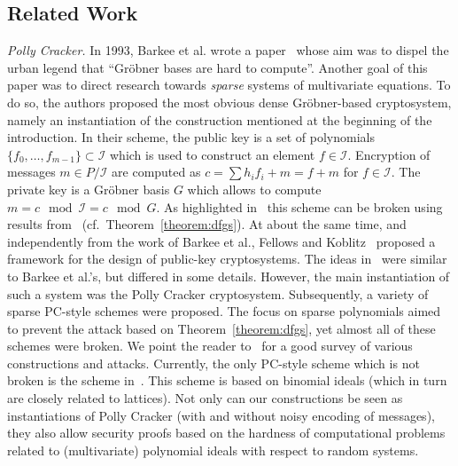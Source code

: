 \documentclass[draft]{llncs}
\newcommand{\sys}{\ensuremath{f_0,\dots,f_{m-1}}\xspace}
\newcommand{\I}{\ensuremath{\mathcal{I}}\xspace}
\begin{document}
\vspace{-4mm} \subsection{Related Work}
\vspace{-2mm}
{\it Polly Cracker.} In 1993, Barkee et al. wrote a paper~\cite{DBLP:journals/jsc/BarkeeCEMR94} whose aim was to dispel the urban legend that ``Gröbner bases are hard to compute''. Another goal of this paper was to direct research towards \emph{sparse} systems of multivariate equations.
To do so, the authors proposed the most obvious dense Gröbner-based cryptosystem, namely an instantiation of the construction mentioned at the beginning of the introduction. In their scheme, the public key is a set of polynomials $\{ \sys \} \subset \I$ which is used to construct an element $f \in \I$. Encryption of messages $m \in P/\I$ are computed as $c = \sum h_i f_i + m = f + m$ for $f \in \I$. The private key is a Gröbner basis $G$ which allows to compute $m = c \mod \I = c \mod G$. As highlighted in~\cite{DBLP:journals/jsc/BarkeeCEMR94} this scheme can be broken using results from~\cite{DFGS91} (cf.\ Theorem~\ref{theorem:dfgs}).
At about the same time, and independently from the work of Barkee et al., Fellows and Koblitz~\cite{Fellows&Koblitz:1994} proposed a framework for the design of public-key cryptosystems. The ideas in~\cite{Fellows&Koblitz:1994} were similar to Barkee et al.'s, but differed in some details. However, the main instantiation of such a system was the Polly Cracker cryptosystem. 
Subsequently, a variety of sparse PC-style schemes were proposed. The focus on sparse polynomials aimed to prevent the attack based on Theorem~\ref{theorem:dfgs}, yet almost all of these schemes were broken. We point the reader to~\cite{LdVMPT09} for a good survey of various constructions and attacks. Currently, the only PC-style scheme which is not broken is the scheme in~\cite{Caboara:2011:LPC:1950980.1951071}. This scheme is based on binomial ideals (which in turn are closely related to lattices). Not only can our constructions be seen as instantiations of Polly Cracker (with and without noisy encoding of messages), they also allow security proofs based on the hardness of computational problems related to (multivariate) polynomial ideals with respect to random systems.
\end{document}

